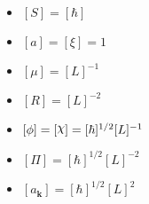 \begin{itemize}
	\item $[S]=[\hbar]$
	\item $[a]=[\xi]=1$
	\item $[\mu]=[L]^{-1}$
	\item $[R]=[L]^{-2}$
	\item $[\phi]=[\rchi]=[\hbar]^{1/2}[L]^{-1}$
	\item $[\Pi]=[\hbar]^{1/2}[L]^{-2}$
	\item $[a_\mathbf{k}]=[\hbar]^{1/2}[L]^2$
\end{itemize}